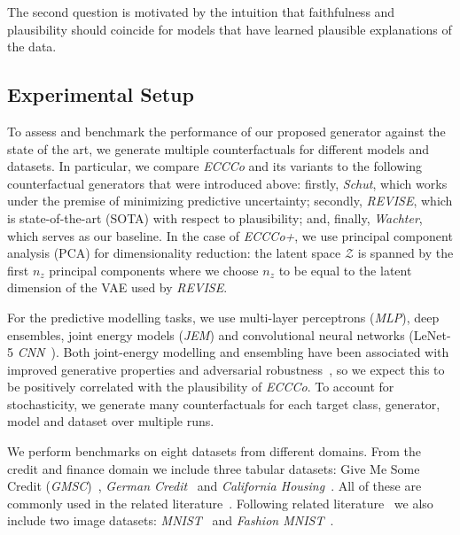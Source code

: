 \documentclass[letterpaper]{article} %
\begin{document}
The second question is motivated by the intuition that faithfulness and plausibility should coincide for models that have learned plausible explanations of the data.

\subsection{Experimental Setup}\label{emp:setup}

To assess and benchmark the performance of our proposed generator against the state of the art, we generate multiple counterfactuals for different models and datasets. In particular, we compare \textit{ECCCo} and its variants to the following counterfactual generators that were introduced above: firstly, \textit{Schut}, which works under the premise of minimizing predictive uncertainty; secondly, \textit{REVISE}, which is state-of-the-art (SOTA) with respect to plausibility; and, finally, \textit{Wachter}, which serves as our baseline. In the case of \textit{ECCCo+}, we use principal component analysis (PCA) for dimensionality reduction: the latent space $\mathcal{Z}$ is spanned by the first $n_z$ principal components where we choose $n_z$ to be equal to the latent dimension of the VAE used by \textit{REVISE}.

For the predictive modelling tasks, we use multi-layer perceptrons (\textit{MLP}), deep ensembles, joint energy models (\textit{JEM}) and convolutional neural networks (LeNet-5 \textit{CNN}~\citep{lecun1998gradient}). Both joint-energy modelling and ensembling have been associated with improved generative properties and adversarial robustness~\citep{grathwohl2020your,lakshminarayanan2016simple}, so we expect this to be positively correlated with the plausibility of \textit{ECCCo}. To account for stochasticity, we generate many counterfactuals for each target class, generator, model and dataset over multiple runs.

We perform benchmarks on eight datasets from different domains. From the credit and finance domain we include three tabular datasets: Give Me Some Credit (\textit{GMSC})~\citep{kaggle2011give}, \textit{German Credit}~\citep{hoffman1994german} and \textit{California Housing}~\citep{pace1997sparse}. All of these are commonly used in the related literature~\citep{karimi2020survey,altmeyer2023endogenous,pawelczyk2021carla}. Following related literature~\citep{schut2021generating,dhurandhar2018explanations} we also include two image datasets: \textit{MNIST}~\citep{lecun1998mnist} and \textit{Fashion MNIST}~\citep{xiao2017fashion}. 
\end{document}
